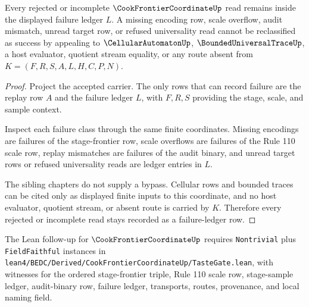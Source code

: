 \begin{theorem}
\label{thm:cook-frontier-coordinate-failure-ledger-nonescape}
Every rejected or incomplete $\CookFrontierCoordinateUp$ read remains inside the displayed failure ledger $L$. A missing encoding row, scale overflow, audit mismatch, unread target row, or refused universality read cannot be reclassified as success by appealing to $\CellularAutomatonUp$, $\BoundedUniversalTraceUp$, a host evaluator, quotient stream equality, or any route absent from $K=(F,R,S,A,L,H,C,P,N)$.
\end{theorem}
\begin{proof}
Project the accepted carrier. The only rows that can record failure are the replay row $A$ and the failure ledger $L$, with $F,R,S$ providing the stage, scale, and sample context.

Inspect each failure class through the same finite coordinates. Missing encodings are failures of the stage-frontier row, scale overflows are failures of the Rule 110 scale row, replay mismatches are failures of the audit binary, and unread target rows or refused universality reads are ledger entries in $L$.

The sibling chapters do not supply a bypass. Cellular rows and bounded traces can be cited only as displayed finite inputs to this coordinate, and no host evaluator, quotient stream, or absent route is carried by $K$. Therefore every rejected or incomplete read stays recorded as a failure-ledger row.
\end{proof}

The Lean follow-up for $\CookFrontierCoordinateUp$ requires \texttt{Nontrivial} plus \texttt{FieldFaithful} instances in \texttt{lean4/BEDC/Derived/CookFrontierCoordinateUp/TasteGate.lean}, with witnesses for the ordered stage-frontier triple, Rule 110 scale row, stage-sample ledger, audit-binary row, failure ledger, transports, routes, provenance, and local naming field.

